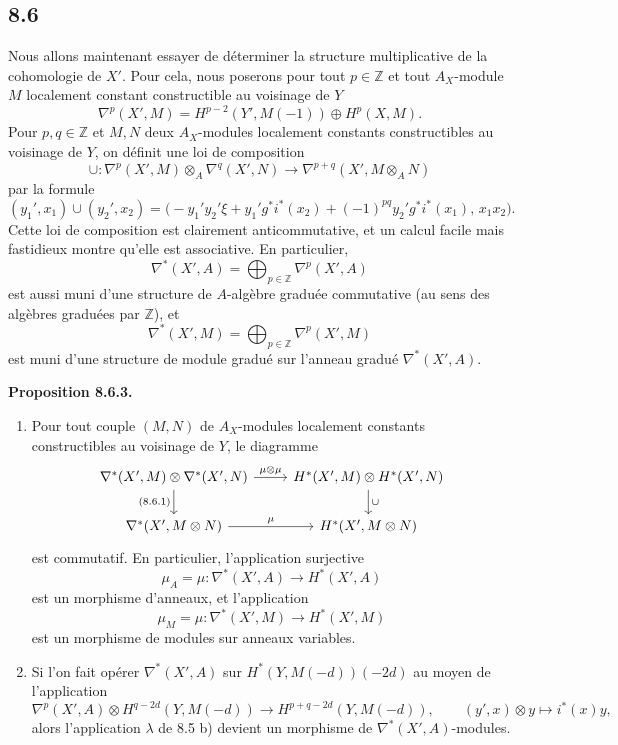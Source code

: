 \documentclass[11pt]{article}
\newenvironment{statement}[1]{\par\medskip\noindent\textbf{#1.}\ }{\par\medskip}
\begin{document}
\subsection*{8.6}

Nous allons maintenant essayer de déterminer la structure multiplicative de la cohomologie de $X'$. Pour cela, nous poserons pour tout $p\in\mathbb Z$ et tout $A_X$-module $M$ localement constant constructible au voisinage de $Y$
\[
\nabla^p(X',M)=H^{p-2}(Y',M(-1))\oplus H^p(X,M).
\]
Pour $p,q\in\mathbb Z$ et $M,N$ deux $A_X$-modules localement constants constructibles au voisinage de $Y$, on définit une loi de composition
\[
\cup:\nabla^p(X',M)\otimes_A\nabla^q(X',N)\to
\nabla^{p+q}(X',M\otimes_A N)
\tag{8.6.1}
\]
par la formule
\[
(y_1',x_1)\cup(y_2',x_2)=
\bigl(-y_1'y_2'\xi+y_1'g^*i^*(x_2)+(-1)^{pq}y_2'g^*i^*(x_1),\,x_1x_2\bigr).
\tag{8.6.2}
\]
Cette loi de composition est clairement anticommutative, et un calcul facile mais fastidieux montre qu'elle est associative. En particulier,
\[
\nabla^*(X',A)=\bigoplus_{p\in\mathbb Z}\nabla^p(X',A)
\]
est aussi muni d'une structure de $A$-algèbre graduée commutative (au sens des algèbres graduées par $\mathbb Z$), et
\[
\nabla^*(X',M)=\bigoplus_{p\in\mathbb Z}\nabla^p(X',M)
\]
est muni d'une structure de module gradué sur l'anneau gradué $\nabla^*(X',A)$.

\begin{statement}{Proposition 8.6.3}
\begin{enumerate}[label=\alph*)]
\item Pour tout couple $(M,N)$ de $A_X$-modules localement constants constructibles au voisinage de $Y$, le diagramme
\[
\begin{tikzcd}
\nabla^*(X',M)\otimes\nabla^*(X',N)\arrow[r,"\mu\otimes\mu"]\arrow[d,"{(8.6.1)}"']&
H^*(X',M)\otimes H^*(X',N)\arrow[d,"\cup"]\\
\nabla^*(X',M\otimes N)\arrow[r,"\mu"]&
H^*(X',M\otimes N)
\end{tikzcd}
\]
est commutatif. En particulier, l'application surjective
\[
\mu_A=\mu:\nabla^*(X',A)\to H^*(X',A)
\]
est un morphisme d'anneaux, et l'application
\[
\mu_M=\mu:\nabla^*(X',M)\to H^*(X',M)
\]
est un morphisme de modules sur anneaux variables.
\item Si l'on fait opérer $\nabla^*(X',A)$ sur $H^*(Y,M(-d))(-2d)$ au moyen de l'application
\[
\nabla^p(X',A)\otimes H^{q-2d}(Y,M(-d))
\to H^{p+q-2d}(Y,M(-d)),
\qquad
(y',x)\otimes y\mapsto i^*(x)y,
\]
alors l'application $\lambda$ de 8.5 b) devient un morphisme de $\nabla^*(X',A)$-modules.
\end{enumerate}
\end{statement}
\end{document}
